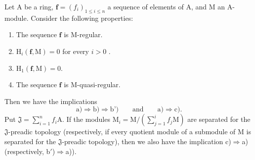 \begin{theorem}[19.5.1]
\label{IV.19.5.1}
Let $\mathrm{A}$ be a ring, $\mathbf{f}=(f_i)_{1\leq i\leq n}$ a sequence of elements of $\mathrm{A}$, and $\mathrm{M}$ an $\mathrm{A}$-module. Consider the following properties:
\begin{enumerate}
\item[\rm a)] The sequence $\mathbf{f}$ is M-regular.
\item[\rm b)] $\mathrm{H}_i(\mathbf{f},\mathrm{M})=0$ for every $i>0$ .
\item[\rm b')] $\mathrm{H}_1(\mathbf{f},\mathrm{M})=0$.
\item[\rm c)] The sequence $\mathbf{f}$ is M-quasi-regular.
\end{enumerate}
Then we have the implications
\[
  \text{a)}\Longrightarrow\text{b)}\Longrightarrow\text{b')}
  \qquad\text{and}\qquad
  \text{a)}\Longrightarrow\text{c)}.
\]
Put $\mathfrak{J}=\sum_{i=1}^n f_i\mathrm{A}$.
If the modules $\mathrm{M}_i=\mathrm{M}/(\sum_{j=1}^i f_j\mathrm{M})$ are separated for the $\mathfrak{J}$-preadic topology \textup{(respectively,} if every quotient module of a submodule of $\mathrm{M}$ is separated for the $\mathfrak{J}$-preadic topology), then we also have the implication \textup{c)}$\Rightarrow$\textup{a)} \textup{(respectively, b$'$)}$\Rightarrow$\textup{a))}.
\end{theorem}

